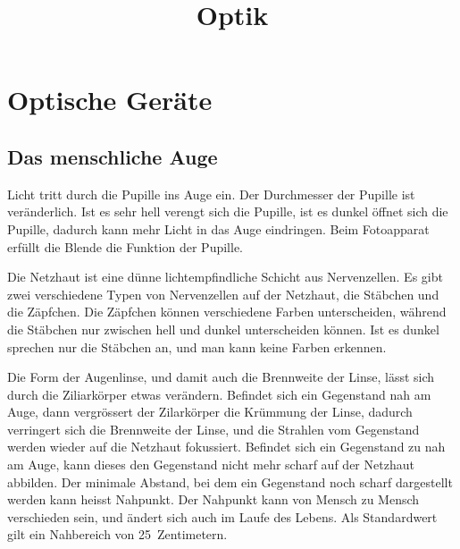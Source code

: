 \documentclass[12pt,a4paper,twoside]{article}
\date{}
\title{Optik}
\begin{document}

\addtocounter{page}{5}
\addtocounter{section}{9}
\addtocounter{aufgabe}{27}


\section{Optische Geräte}

\subsection{Das menschliche Auge}
\begin{center}
\end{center}

Licht tritt durch die Pupille ins Auge ein. Der Durchmesser der Pupille ist veränderlich. Ist es sehr hell verengt sich die Pupille,
ist es dunkel öffnet sich die Pupille, dadurch kann mehr Licht in das Auge eindringen. Beim Fotoapparat erfüllt die Blende die Funktion der Pupille. 

Die Netzhaut ist eine dünne lichtempfindliche Schicht aus Nervenzellen. Es gibt zwei verschiedene Typen von Nervenzellen auf der Netzhaut,
die Stäbchen und die Zäpfchen. Die Zäpfchen können verschiedene Farben unterscheiden, während die Stäbchen nur zwischen hell und dunkel unterscheiden können.
Ist es dunkel sprechen nur die Stäbchen an, und man kann keine Farben erkennen.

Die Form der Augenlinse, und damit auch die Brennweite der Linse, lässt sich durch die Ziliarkörper etwas verändern.
Befindet sich ein Gegenstand nah am Auge, dann vergrössert der Zilarkörper die Krümmung der Linse, dadurch verringert sich die Brennweite der Linse, und
die Strahlen vom Gegenstand werden wieder auf die Netzhaut fokussiert.
Befindet sich ein Gegenstand zu nah am Auge, kann dieses den Gegenstand nicht mehr scharf auf der Netzhaut abbilden.
Der minimale Abstand, bei dem ein Gegenstand noch scharf dargestellt werden kann heisst Nahpunkt.
Der Nahpunkt kann von Mensch zu Mensch verschieden sein, und ändert sich auch im Laufe des Lebens.
Als Standardwert gilt ein Nahbereich von \SI{25}{Zentimetern}.
\end{document}
